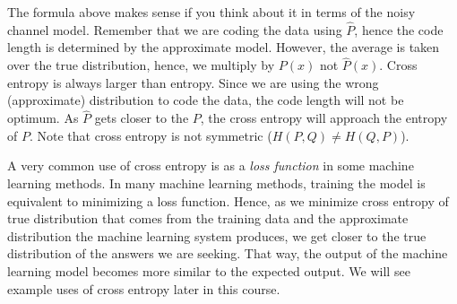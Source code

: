 The formula above makes sense if you think about it
in terms of the noisy channel model.
Remember that we are coding the data using $\hat{P}$,
hence the code length is determined by the approximate model.
However, the average is taken over the true distribution,
hence, we multiply by $P(x)$ not $\hat{P}(x)$.
Cross entropy is always larger than entropy.
Since we are using the wrong (approximate) distribution to code the data,
the code length will not be optimum.
As $\hat{P}$ gets closer to the $P$,
the cross entropy will approach the entropy of $P$.
Note that cross entropy is not symmetric ($H(P, Q) \ne H(Q, P)$).

A very common use of cross entropy is as a \emph{loss function}
in some machine learning methods.
In many machine learning methods,
training the model is equivalent to minimizing a loss function.
Hence,
as we minimize cross entropy of true distribution
that comes from the training data
and the approximate distribution the machine learning system produces,
we get closer to the true distribution of the answers we are seeking.
That way,
the output of the machine learning model becomes
more similar to the expected output.
We will see example uses of cross entropy later in this course.

